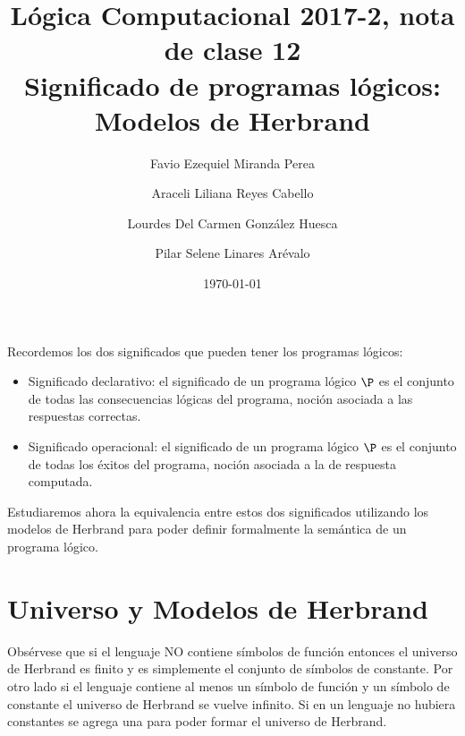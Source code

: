 \documentclass[11pt,letterpaper]{article}
\title{Lógica Computacional 2017-2, nota de clase 12\\
Significado de programas l\'ogicos: Modelos de Herbrand}
\author{Favio Ezequiel Miranda Perea \and Araceli Liliana Reyes Cabello\and
Lourdes Del Carmen Gonz\'alez Huesca \and Pilar Selene Linares Arévalo}
\date{\today}
\begin{document}
\maketitle

\noindent 
Recordemos los dos significados que pueden tener los programas l\'ogicos:
\begin{itemize}
 \item Significado declarativo: 
  el significado de un programa l\'ogico $\P$ es el conjunto de todas 
  las consecuencias l\'ogicas del programa, noci\'on asociada a las respuestas 
  correctas.
 \item Significado operacional: 
  el significado de un programa l\'ogico $\P$ es el conjunto de todas 
  los \'exitos del programa, noci\'on asociada a la de respuesta computada.
\end{itemize}
Estudiaremos ahora la equivalencia entre estos dos significados utilizando los 
modelos de Herbrand para poder definir formalmente la sem\'antica de un programa 
l\'ogico.

\vspace*{-15pt}

\section{Universo y Modelos de Herbrand}


Obs\'ervese que si el lenguaje NO contiene s\'imbolos de funci\'on entonces el
universo de Herbrand es finito y es simplemente el conjunto de s\'imbolos de 
constante. 
Por otro lado si el lenguaje contiene al menos un s\'imbolo de funci\'on y un 
s\'imbolo de constante el universo de Herbrand se vuelve infinito. Si en un
lenguaje no hubiera constantes se agrega una para poder formar el universo de 
Herbrand.

\end{document}
